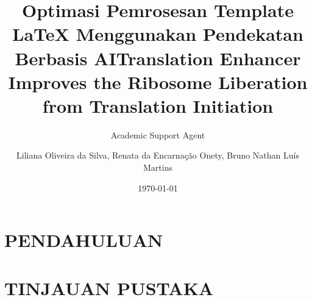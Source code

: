 \documentclass{beamer}
\title{Optimasi Pemrosesan Template LaTeX Menggunakan Pendekatan Berbasis AI}
\author{Academic Support Agent}
\date{\today}
\begin{document}
\maketitle

\begin{abstract}

\end{abstract}

\chapter{PENDAHULUAN}


\chapter{TINJAUAN PUSTAKA}



 {
}



\title[Apresentação Parcial]{Translation Enhancer Improves the Ribosome Liberation from Translation Initiation} 

\author[Silva, L. O.]{
Liliana Oliveira da Silva, Renata da Encarnação Onety, Bruno Nathan Luís Martins} 
\end{document}
